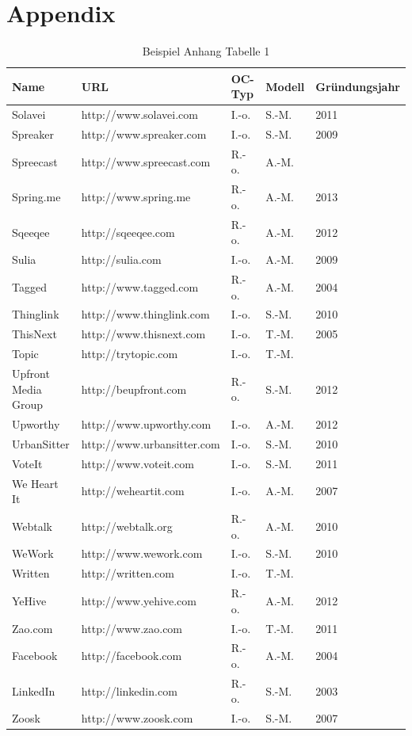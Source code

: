 \chapter{Appendix}

\begin{table}[htbp]
  \centering
  \footnotesize
  \caption{Beispiel Anhang Tabelle 1}
  \label{tab:addlabel}
    \begin{tabular}{@{}lllll@{}}
    \toprule
    \textbf{Name} & \textbf{URL} & \textbf{OC-Typ} & \textbf{Modell} & \textbf{Gründungsjahr} \\
    \midrule
    Solavei & http://www.solavei.com & I.-o. & S.-M. & 2011 \\
    Spreaker & http://www.spreaker.com & I.-o. & S.-M. & 2009 \\
    Spreecast & http://www.spreecast.com & R.-o. & A.-M. &  \\
    Spring.me & http://www.spring.me & R.-o. & A.-M. & 2013 \\
    Sqeeqee & http://sqeeqee.com & R.-o. & A.-M. & 2012 \\
    Sulia & http://sulia.com & I.-o. & A.-M. & 2009 \\
    Tagged & http://www.tagged.com & R.-o. & A.-M. & 2004 \\
    Thinglink & http://www.thinglink.com & I.-o. & S.-M. & 2010 \\
    ThisNext & http://www.thisnext.com & I.-o. & T.-M. & 2005 \\
    Topic & http://trytopic.com & I.-o. & T.-M. &  \\
    Upfront Media Group & http://beupfront.com & R.-o. & S.-M. & 2012 \\
    Upworthy & http://www.upworthy.com & I.-o. & A.-M. & 2012 \\
    UrbanSitter & http://www.urbansitter.com & I.-o. & S.-M. & 2010 \\
    VoteIt & http://www.voteit.com & I.-o. & S.-M. & 2011 \\
    We Heart It & http://weheartit.com & I.-o. & A.-M. & 2007 \\
    Webtalk & http://webtalk.org & R.-o. & A.-M. & 2010 \\
    WeWork & http://www.wework.com & I.-o. & S.-M. & 2010 \\
    Written & http://written.com & I.-o. & T.-M. &  \\
    YeHive & http://www.yehive.com & R.-o. & A.-M. & 2012 \\
    Zao.com & http://www.zao.com & I.-o. & T.-M. & 2011 \\
    Facebook & http://facebook.com & R.-o. & A.-M. & 2004 \\
    LinkedIn & http://linkedin.com & R.-o. & S.-M. & 2003 \\
    Zoosk & http://www.zoosk.com & I.-o. & S.-M. & 2007 \\
    \bottomrule
    \end{tabular}
\end{table}
